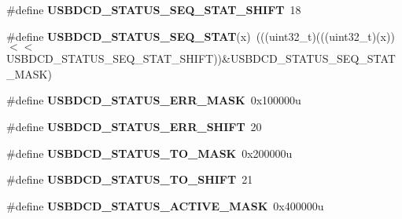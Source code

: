 \begin{DoxyCompactItemize}
\item 
\#define {\bfseries U\+S\+B\+D\+C\+D\+\_\+\+S\+T\+A\+T\+U\+S\+\_\+\+S\+E\+Q\+\_\+\+S\+T\+A\+T\+\_\+\+S\+H\+I\+FT}~18\hypertarget{group__USBDCD__Register__Masks_ga8e3d04ac9b5b6195f765f29f82264376}{}\label{group__USBDCD__Register__Masks_ga8e3d04ac9b5b6195f765f29f82264376}

\item 
\#define {\bfseries U\+S\+B\+D\+C\+D\+\_\+\+S\+T\+A\+T\+U\+S\+\_\+\+S\+E\+Q\+\_\+\+S\+T\+AT}(x)~(((uint32\+\_\+t)(((uint32\+\_\+t)(x))$<$$<$U\+S\+B\+D\+C\+D\+\_\+\+S\+T\+A\+T\+U\+S\+\_\+\+S\+E\+Q\+\_\+\+S\+T\+A\+T\+\_\+\+S\+H\+I\+FT))\&U\+S\+B\+D\+C\+D\+\_\+\+S\+T\+A\+T\+U\+S\+\_\+\+S\+E\+Q\+\_\+\+S\+T\+A\+T\+\_\+\+M\+A\+SK)\hypertarget{group__USBDCD__Register__Masks_gaa4db555b4aa4832902a32703f86116ea}{}\label{group__USBDCD__Register__Masks_gaa4db555b4aa4832902a32703f86116ea}

\item 
\#define {\bfseries U\+S\+B\+D\+C\+D\+\_\+\+S\+T\+A\+T\+U\+S\+\_\+\+E\+R\+R\+\_\+\+M\+A\+SK}~0x100000u\hypertarget{group__USBDCD__Register__Masks_gaa0a0297c32e8af91d40e8cba8ffe8d1e}{}\label{group__USBDCD__Register__Masks_gaa0a0297c32e8af91d40e8cba8ffe8d1e}

\item 
\#define {\bfseries U\+S\+B\+D\+C\+D\+\_\+\+S\+T\+A\+T\+U\+S\+\_\+\+E\+R\+R\+\_\+\+S\+H\+I\+FT}~20\hypertarget{group__USBDCD__Register__Masks_gac82e47386e1af144b9e4d579bacfca50}{}\label{group__USBDCD__Register__Masks_gac82e47386e1af144b9e4d579bacfca50}

\item 
\#define {\bfseries U\+S\+B\+D\+C\+D\+\_\+\+S\+T\+A\+T\+U\+S\+\_\+\+T\+O\+\_\+\+M\+A\+SK}~0x200000u\hypertarget{group__USBDCD__Register__Masks_ga69616f9e6fd32921dee0543a3cfde633}{}\label{group__USBDCD__Register__Masks_ga69616f9e6fd32921dee0543a3cfde633}

\item 
\#define {\bfseries U\+S\+B\+D\+C\+D\+\_\+\+S\+T\+A\+T\+U\+S\+\_\+\+T\+O\+\_\+\+S\+H\+I\+FT}~21\hypertarget{group__USBDCD__Register__Masks_ga2b59871476643f7c428868c6ebbcef5a}{}\label{group__USBDCD__Register__Masks_ga2b59871476643f7c428868c6ebbcef5a}

\item 
\#define {\bfseries U\+S\+B\+D\+C\+D\+\_\+\+S\+T\+A\+T\+U\+S\+\_\+\+A\+C\+T\+I\+V\+E\+\_\+\+M\+A\+SK}~0x400000u\hypertarget{group__USBDCD__Register__Masks_ga6127ac2a4e36e01dfe2c939203f8a72f}{}\label{group__USBDCD__Register__Masks_ga6127ac2a4e36e01dfe2c939203f8a72f}


\end{DoxyCompactItemize}

